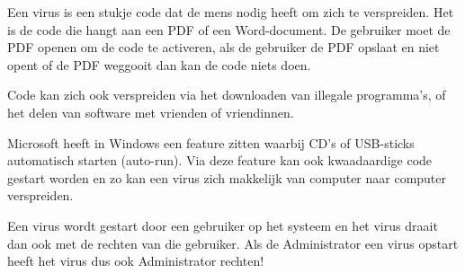 Een virus is een stukje code dat de mens nodig heeft om zich te verspreiden. Het is de code die hangt aan een PDF of een Word-document. De gebruiker moet de PDF openen om de code te activeren, als de gebruiker de PDF opslaat en niet opent of de PDF weggooit dan kan de code niets doen.

Code kan zich ook verspreiden via het downloaden van illegale programma's, of het delen van software met vrienden of vriendinnen.

Microsoft heeft in Windows een feature zitten waarbij CD's of USB-sticks automatisch starten (auto-run). Via deze feature kan ook kwaadaardige code gestart worden en zo kan een virus zich makkelijk van computer naar computer verspreiden.

Een virus wordt gestart door een gebruiker op het systeem en het virus draait dan ook met de rechten van die gebruiker. Als de Administrator een virus opstart heeft het virus dus ook Administrator rechten!

